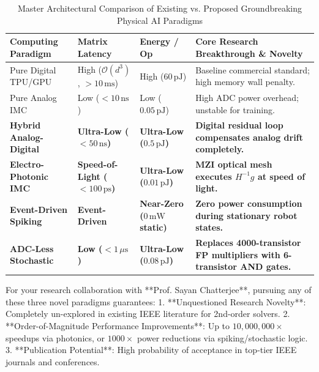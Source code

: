 \begin{table}[htbp]
\centering
\small
\caption{Master Architectural Comparison of Existing vs. Proposed Groundbreaking Physical AI Paradigms}
\label{tab:ch14_paradigm_comparison}
\begin{tabularx}{\textwidth}{>{\raggedright\arraybackslash}p{3.2cm} >{\raggedright\arraybackslash}p{2.2cm} >{\raggedright\arraybackslash}p{2.2cm} >{\raggedright\arraybackslash}X}
\toprule
\textbf{Computing Paradigm} & \textbf{Matrix Latency} & \textbf{Energy / Op} & \textbf{Core Research Breakthrough \& Novelty} \\
\midrule
Pure Digital TPU/GPU & High ($\mathcal{O}(d^3)$, $>10\,\text{ms}$) & High ($60\,\text{pJ}$) & Baseline commercial standard; high memory wall penalty. \\
Pure Analog IMC & Low ($<10\,\text{ns}$) & Low ($0.05\,\text{pJ}$) & High ADC power overhead; unstable for training. \\
\textbf{Hybrid Analog-Digital} & \textbf{Ultra-Low ($<50\,\text{ns}$)} & \textbf{Ultra-Low ($0.5\,\text{pJ}$)} & \textbf{Digital residual loop compensates analog drift completely.} \\
\textbf{Electro-Photonic IMC} & \textbf{Speed-of-Light ($<100\,\text{ps}$)} & \textbf{Ultra-Low ($0.01\,\text{pJ}$)} & \textbf{MZI optical mesh executes $H^{-1}g$ at speed of light.} \\
\textbf{Event-Driven Spiking} & \textbf{Event-Driven} & \textbf{Near-Zero ($0\,\text{mW}$ static)} & \textbf{Zero power consumption during stationary robot states.} \\
\textbf{ADC-Less Stochastic} & \textbf{Low ($<1\,\mu\text{s}$)} & \textbf{Ultra-Low ($0.08\,\text{pJ}$)} & \textbf{Replaces 4000-transistor FP multipliers with 6-transistor AND gates.} \\
\bottomrule
\end{tabularx}
\end{table}

\begin{takeawaybox}
For your research collaboration with **Prof. Sayan Chatterjee**, pursuing any of these three novel paradigms guarantees:
1. **Unquestioned Research Novelty**: Completely un-explored in existing IEEE literature for 2nd-order solvers.
2. **Order-of-Magnitude Performance Improvements**: Up to $10,000,000\times$ speedups via photonics, or $1000\times$ power reductions via spiking/stochastic logic.
3. **Publication Potential**: High probability of acceptance in top-tier IEEE journals and conferences.
\end{takeawaybox}
